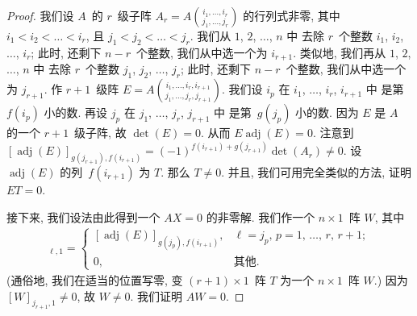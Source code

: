 \begin{proof}
    我们设 \(A\)~的 \(r\)~级子阵
    \(
    \displaystyle
    A_r = A\binom{i_1,\dots,i_r}{j_1,\dots,j_r}
    \)
    的行列式非零,
    其中 \(i_1 < i_2 < \dots < i_r\),
    且 \(j_1 < j_2 < \dots < j_r\).
    我们从 \(1\), \(2\), \(\dots\), \(n\) 中%
    去除 \(r\)~个整数
    \(i_1\), \(i_2\), \(\dots\), \(i_r\);
    此时, 还剩下 \(n-r\)~个整数,
    我们从中选一个为 \(i_{r+1}\).
    类似地,
    我们再从 \(1\), \(2\), \(\dots\), \(n\) 中%
    去除 \(r\)~个整数
    \(j_1\), \(j_2\), \(\dots\), \(j_r\);
    此时, 还剩下 \(n-r\)~个整数,
    我们从中选一个为 \(j_{r+1}\).
    作 \(r+1\)~级阵
    \(
    \displaystyle
    E =
    A\binom{i_1,\dots,i_r,i_{r+1}}
    {j_1,\dots,j_r,j_{r+1}}
    \).
    我们设 \(i_p\) 在
    \(i_1\), \(\dots\), \(i_r\), \(i_{r+1}\) 中%
    是第~\(f(i_p)\) 小的数.
    再设 \(j_p\) 在
    \(j_1\), \(\dots\), \(j_r\), \(j_{r+1}\) 中%
    是第~\(g(j_p)\) 小的数.
    因为 \(E\) 是 \(A\) 的一个 \(r+1\)~级子阵,
    故 \(\det {(E)} = 0\).
    从而
    \(E \operatorname{adj} {(E)} = 0\).
    注意到
    \([\operatorname{adj} {(E)}]_{g(j_{r+1}), f(i_{r+1})}
    = (-1)^{f(i_{r+1})+g(j_{r+1})} \det {(A_r)} \neq 0\).
    设 \(\operatorname{adj} {(E)}\)
    的列~\(f(i_{r+1})\) 为 \(T\).
    那么 \(T \neq 0\).
    并且, 我们可用完全类似的方法, 证明
    \(ET = 0\).

    接下来, 我们设法由此得到一个 \(AX = 0\)
    的非零解.
    我们作一个 \(n \times 1\)~阵 \(W\), 其中
    \begin{align*}
        [W]_{\ell,1}
        = \begin{cases}
              [\operatorname{adj} {(E)}]_{g(j_p),f(i_{r+1})},
                 & \text{\(\ell = j_p\),
              \(p = 1\), \(\dots\), \(r\), \(r+1\)}; \\
              0, & \text{其他}.
          \end{cases}
    \end{align*}
    (通俗地, 我们在适当的位置写零,
    变 \((r+1) \times 1\)~阵 \(T\)
    为一个 \(n \times 1\)~阵 \(W\).)
    因为 \([W]_{j_{r+1},1} \neq 0\),
    故 \(W \neq 0\).
    我们证明 \(AW = 0\).


\end{proof}
